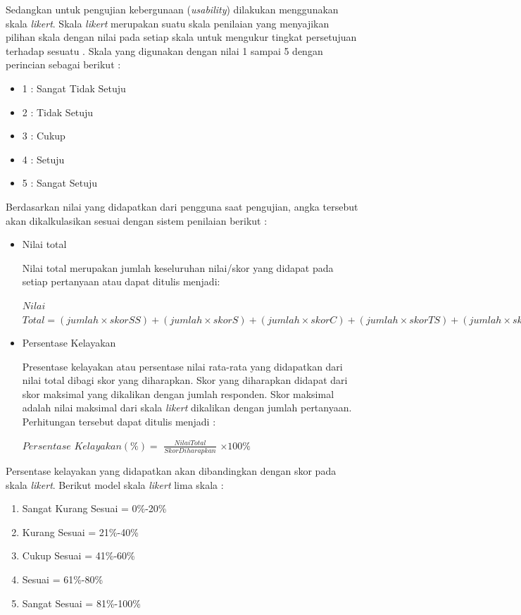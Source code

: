 Sedangkan untuk pengujian kebergunaan (\textit{usability}) dilakukan menggunakan skala \textit{likert}. Skala \textit{likert} merupakan 
suatu skala penilaian yang menyajikan pilihan skala dengan nilai pada setiap skala untuk mengukur tingkat persetujuan terhadap sesuatu \cite{Maryuliana}.  Skala yang digunakan dengan nilai 1 sampai 5 dengan perincian sebagai berikut :
\begin{itemize}
	\item 1 : Sangat Tidak Setuju
	\item 2 : Tidak Setuju
	\item 3 : Cukup
	\item 4 : Setuju
	\item 5 : Sangat Setuju
\end{itemize}

Berdasarkan nilai yang didapatkan dari pengguna saat pengujian, angka tersebut akan dikalkulasikan sesuai dengan sistem penilaian berikut :

\begin{itemize}
	\item Nilai total
	
	Nilai total merupakan jumlah keseluruhan nilai/skor yang didapat pada setiap pertanyaan atau dapat ditulis menjadi:
	
	$Nilai$ $Total = (jumlah \times skor SS) + (jumlah \times skor S) + (jumlah \times skor C) + (jumlah \times skor TS) + (jumlah \times skor STS)$ 
	
	\item Persentase Kelayakan
	
	Presentase kelayakan atau persentase nilai rata-rata yang didapatkan dari nilai total dibagi skor yang diharapkan. Skor yang diharapkan didapat dari skor maksimal yang dikalikan dengan jumlah responden. Skor maksimal adalah nilai maksimal dari skala \textit{likert} dikalikan dengan jumlah pertanyaan. Perhitungan tersebut dapat ditulis menjadi :
	
	$Persentase$ $Kelayakan (\%) = $ $\frac{Nilai Total}{Skor Diharapkan}$ $\times 100\%$

\end{itemize}

Persentase kelayakan yang didapatkan akan dibandingkan dengan skor pada skala \textit{likert}. Berikut model skala \textit{likert} lima skala :
\begin{enumerate}
	\item Sangat Kurang Sesuai = 0\%-20\%
	\item Kurang Sesuai = 21\%-40\%
	\item Cukup Sesuai = 41\%-60\%
	\item Sesuai = 61\%-80\%
	\item Sangat Sesuai = 81\%-100\%
\end{enumerate}

